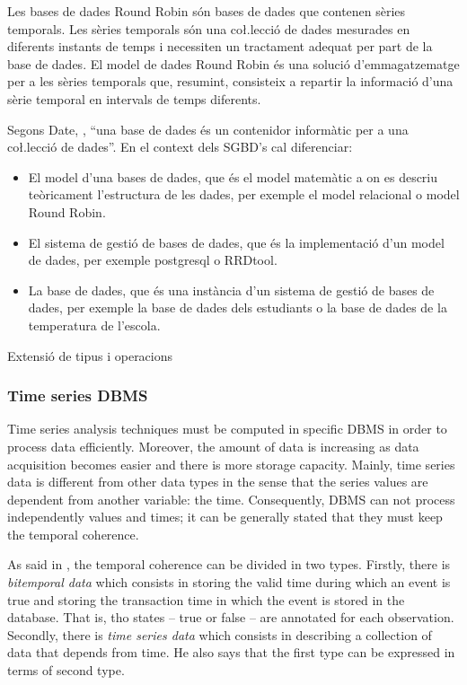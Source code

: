 Les bases de dades Round Robin són bases de dades que contenen sèries temporals. Les sèries temporals són una co\l.lecció de dades mesurades en diferents instants de temps i necessiten un tractament adequat per part de la base de dades. 
El model de dades Round Robin és una solució d'emmagatzematge per a les sèries temporals que, resumint, consisteix a repartir la informació d'una sèrie temporal en intervals de temps diferents.

Segons Date, \cite{date}, ``una base de dades és un contenidor
informàtic per a una co\l.lecció de dades''. En el context dels SGBD's
cal diferenciar:
\begin{itemize}
\item El model d'una bases de dades, que és el model matemàtic a on es
  descriu teòricament l'estructura de les dades, per exemple el model
  relacional o model Round Robin.

\item El sistema de gestió de bases de dades, que és la implementació
  d'un model de dades, per exemple postgresql o
  RRDtool. %

\item La base de dades, que és una instància d'un sistema de gestió de
  bases de dades, per exemple la base de dades dels estudiants o la
  base de dades de la temperatura de l'escola.
\end{itemize}


Extensió de tipus i operacions \parencite{stonebraker86}


\subsubsection{Time series DBMS}

Time series analysis techniques must be computed in specific DBMS in order to process data efficiently. Moreover, the amount of data is increasing as data acquisition becomes easier and there is more storage capacity. 
Mainly, time series data is different from other data types in the sense that the series values are dependent from another variable: the time. Consequently, DBMS can not process independently values and times; it can be generally stated that they must keep the temporal coherence. 


As said in \textcite{assfalg08:thesis}, the temporal coherence can be divided in two types. Firstly, there is  \emph{bitemporal data} which consists in storing the valid time during which an event is true and storing the transaction time in which the event is stored in the database. That is, tho states -- true or false -- are annotated for each observation.  Secondly, there is \emph{time series data} which consists in describing a collection of data that depends from time. He also says that the first type can be expressed in terms of second type.

